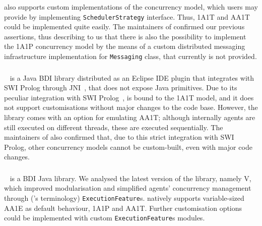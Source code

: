 \astra{} also supports custom implementations of the concurrency model,
which users may provide by implementing \texttt{SchedulerStrategy} interface.
%
Thus, \ac{1A1T} and \ac{AA1T}
could be implemented quite easily.
%
The maintainers of \astra{} confirmed our previous assertions,
thus describing to us that there is also the possibility to implement the \ac{1A1P} concurrency model
by the means of a custom distributed messaging infrastructure implementation for \astra{} \texttt{Messaging} class,
that currently is not provided.

\subsubsection{\goal{}}

\goal{}~\cite{Hindriks2009} is a Java \ac{BDI} library distributed as an Eclipse IDE plugin
that integrates with SWI Prolog through \ac{JNI}~\cite{DBLP:journals/crossroads/Husaini97},
that does not expose Java primitives.
%
Due to its peculiar integration with SWI Prolog~\cite{WielemakerHM08},
\goal{} is bound to the \ac{1A1T} model,
%
and it does not support customisations
without major changes to the code base.
%
However,
the library comes with an option for emulating \ac{AA1T};
although internally agents are still executed on different threads,
these are executed sequentially.
%
The maintainers of \goal{} also confirmed that, 
due to this strict integration with SWI Prolog,
other concurrency models cannot be custom-built,
even with major code changes.

\subsubsection{\jadex{}}

\jadex{}~\cite{PokahrBL2005} is a \ac{BDI} Java library.
%
We analysed the latest version of the library, namely \jadex{} V,
which improved modularisation
and simplified agents' concurrency management through (\jadexV{}'s terminology)
\texttt{ExecutionFeature}s.
%
\jadexV{} natively supports variable-sized \ac{AA1E} as default behaviour, \ac{1A1P} and \ac{AA1T}.
%
Further customisation options could be implemented with custom \texttt{ExecutionFeature}s modules.

\subsubsection{\jakta{}}

